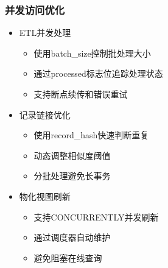 \subsubsection{并发访问优化}
\begin{itemize}
  \item ETL并发处理
  \begin{itemize}
    \item 使用batch\_size控制批处理大小
    \item 通过processed标志位追踪处理状态
    \item 支持断点续传和错误重试
  \end{itemize}
  \item 记录链接优化
  \begin{itemize}
    \item 使用record\_hash快速判断重复
    \item 动态调整相似度阈值
    \item 分批处理避免长事务
  \end{itemize}
  \item 物化视图刷新
  \begin{itemize}
    \item 支持CONCURRENTLY并发刷新
    \item 通过调度器自动维护
    \item 避免阻塞在线查询
  \end{itemize}
\end{itemize}